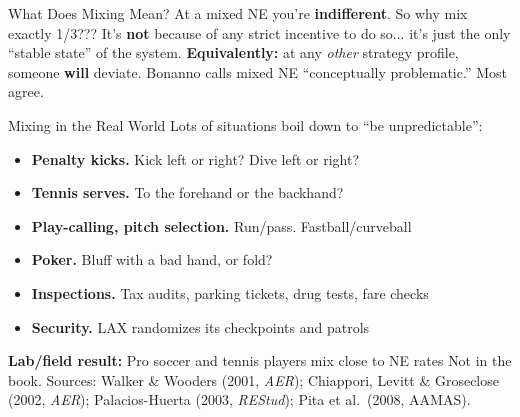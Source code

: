 \begin{frame}{What Does Mixing Mean?}
At a mixed NE you're \textbf{indifferent}. So why mix exactly 1/3???
\bsk
It's \textbf{not} because of any strict incentive to do so...
\bsk
it's just the only ``stable state'' of the system.
\bsk
\textbf{Equivalently:} at any \textit{other} strategy profile, someone \textbf{will} deviate.
\vfill
Bonanno calls mixed NE ``conceptually problematic.'' Most agree.
\vspace{-0.4in}
\end{frame}

\begin{frame}{Mixing in the Real World}
Lots of situations boil down to ``be unpredictable'':
\bsk
\begin{itemize}
    \item \textbf{Penalty kicks.} Kick left or right? Dive left or right?
    \item \textbf{Tennis serves.} To the forehand or the backhand?
    \item \textbf{Play-calling, pitch selection.} Run/pass. Fastball/curveball
    \item \textbf{Poker.} Bluff with a bad hand, or fold?
    \item \textbf{Inspections.} Tax audits, parking tickets, drug tests, fare checks
    \item \textbf{Security.} LAX randomizes its checkpoints and patrols
\end{itemize}
\bsk
\textbf{Lab/field result:} Pro soccer and tennis players mix close to NE rates
\vfill
{\footnotesize Not in the book. Sources: Walker \& Wooders (2001, \textit{AER}); Chiappori, Levitt \& Groseclose (2002, \textit{AER}); Palacios-Huerta (2003, \textit{REStud}); Pita et al.\ (2008, AAMAS).}
\vspace{-0.2in}
\end{frame}

